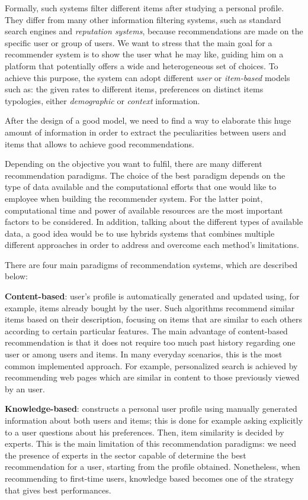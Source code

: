 Formally, such systems filter different items after studying a personal profile. They differ from many other information filtering systems, such as standard search engines and \textit{reputation systems}, because recommendations are made on the specific user or group of users. 
We want to stress that the main goal for a recommender system is to show the user what he may like, guiding him on a platform that potentially offers a wide and heterogeneous set of choices. To achieve this purpose, the system can adopt different \textit{user} or \textit{item-based}  models such as: the given rates to different items, preferences on distinct items typologies, either \textit{demographic} or \textit{context} information. 

After the design of a good model, we need to find a way to elaborate this huge amount of information in order to extract the peculiarities between users and items that allows to achieve good recommendations. 

Depending on the objective you want to fulfil, there are many different recommendation paradigms. The choice of the best paradigm depends on the type of data available and the computational efforts that one would like to employee when building the recommender system. For the latter point, computational time and power of available resources are the most important factors to be considered. In addition, talking about the different types of available data, a good idea would be to use hybrids systems that combines multiple different approaches in order to address and overcome each method’s limitations. 

There are four main paradigms of recommendation systems, which are described below:

\textbf{Content-based}: user's profile is automatically generated and updated using, for example, items already bought by the user. Such algorithms recommend similar items based on their description, focusing on items that are similar to each others according to certain particular features. The main advantage of content-based recommendation is that it does not require too much past history regarding one user or among users and items. In many everyday scenarios, this is the most common implemented approach. For example, personalized search is achieved by recommending web pages which are similar in content to those previously viewed by an user.

\textbf{Knowledge-based}: constructs a personal user profile using manually generated information about both users and items; this is done for example asking explicitly to a user questions about his preferences. Then, item similarity is decided by experts. This is the main limitation of this recommendation paradigms: we need the presence of experts in the sector capable of determine the best recommendation for a user, starting from the profile obtained.
Nonetheless, when recommending to first-time users, knowledge based becomes one of the strategy that gives best performances.

